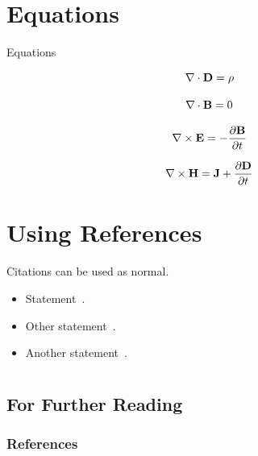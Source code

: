\documentclass{beamer}	%
\begin{document}
\section{Equations}
\begin{frame}{Equations}

\begin{equation}
\nabla\cdot{\bf D} = \rho
\end{equation}

\begin{equation}
\nabla\cdot{\bf B} = 0
\end{equation}

\begin{equation}
\nabla\times{\bf E} = - {{\partial{\bf B}}\over{\partial t}}
\end{equation}

\begin{equation}
\nabla\times{\bf H} = {\bf J} + {{\partial{\bf D}}\over{\partial t}}
\end{equation}

\end{frame}



\section*{Using References}		%

\begin{frame}{Citations can be used as normal.}

  \begin{itemize}
  \item
    Statement~\citep{Box87}.
  \item
    Other statement~\citep{Ashok2013}.
  \item
    Another statement~\citep{Dun84}.
  \end{itemize}

\end{frame}


\section*{}
\subsection*{For Further Reading}		%
\begin{frame}[allowframebreaks]
  \frametitle{References}
  
  
 
\end{frame}
\end{document}
